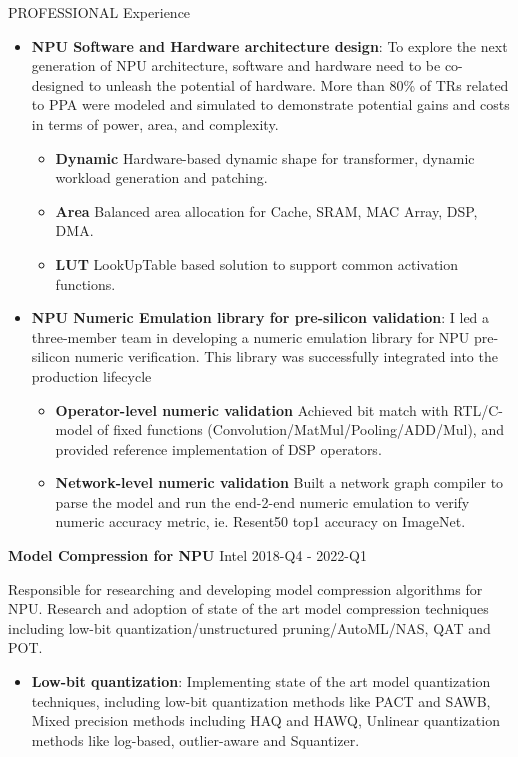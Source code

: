 \documentclass{resume} %
\begin{document}
\begin{rSection}{PROFESSIONAL Experience}
\begin{itemize}
\item \textbf{NPU Software and Hardware architecture design}: 
To explore the next generation of NPU architecture, software and hardware need to be co-designed to unleash the potential of hardware. More than 80\% of TRs related to PPA were modeled and simulated to demonstrate potential gains and costs in terms of power, area, and complexity. 

\begin{itemize}
    \item \textbf{Dynamic} Hardware-based dynamic shape for transformer, dynamic workload generation and patching.
    \item \textbf{Area} Balanced area allocation for Cache, SRAM, MAC Array, DSP, DMA.
    \item \textbf{LUT} LookUpTable based solution to support common activation functions.
\end{itemize}

\item \textbf{NPU Numeric Emulation library for pre-silicon validation}: 
I led a three-member team in developing a numeric emulation library for NPU pre-silicon numeric verification. This library was successfully integrated into the production lifecycle
\begin{itemize}
    \item \textbf{Operator-level numeric validation} Achieved bit match with RTL/C-model of fixed functions (Convolution/MatMul/Pooling/ADD/Mul), and provided reference implementation of DSP operators. 
    \item \textbf{Network-level numeric validation} Built a network graph compiler to parse the model and run the end-2-end numeric emulation to verify numeric accuracy metric, ie. Resent50 top1 accuracy on ImageNet. 
\end{itemize}

\end{itemize}


\textbf{Model Compression for NPU} \hfill Intel 2018-Q4 - 2022-Q1

\vspace{4pt}

Responsible for researching and developing model compression algorithms for NPU. Research and adoption of state of the art model compression techniques including low-bit quantization/unstructured pruning/AutoML/NAS, QAT and POT. 

\begin{itemize}
\item \textbf{Low-bit quantization}:
Implementing state of the art model quantization techniques, including low-bit quantization methods like PACT and SAWB,  Mixed precision methods including HAQ and HAWQ, Unlinear quantization methods like log-based, outlier-aware and Squantizer. 


\end{itemize}
\end{rSection}
\end{document}
